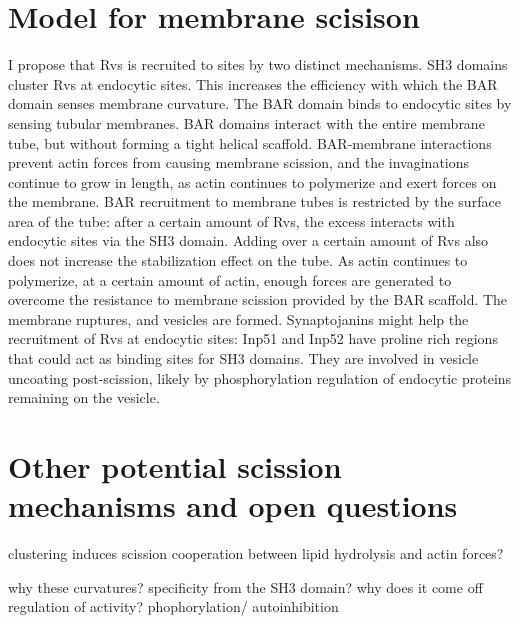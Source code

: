 \section{Model for membrane scisison}
I propose that Rvs is recruited to sites by two distinct mechanisms. SH3 domains cluster Rvs at endocytic sites. This increases the efficiency with which the BAR domain senses membrane curvature. The BAR domain binds to endocytic sites by sensing tubular membranes. BAR domains interact with the entire membrane tube, but without forming a tight helical scaffold. BAR-membrane interactions prevent actin forces from causing membrane scission, and the invaginations continue to grow in length, as actin continues to polymerize and exert forces on the membrane. BAR recruitment to membrane tubes is restricted by the surface area of the tube: after a certain amount of Rvs, the excess interacts with endocytic sites via the SH3 domain. Adding over a certain amount of Rvs also does not increase the stabilization effect on the tube. As actin continues to polymerize, at a certain amount of actin, enough forces are generated to overcome the resistance to membrane scission provided by the BAR scaffold. The membrane ruptures, and vesicles are formed. Synaptojanins might help the recruitment of Rvs at endocytic sites: Inp51 and Inp52 have proline rich regions that could act as binding sites for SH3 domains. They are involved in vesicle uncoating post-scission, likely by phosphorylation regulation of endocytic proteins remaining on the vesicle. 


\section{Other potential scission mechanisms and open questions}

\cite{Demitrieff.2015}
clustering induces scission 
cooperation between lipid hydrolysis and actin forces?


why these curvatures? specificity from the SH3 domain?
why does it come off
regulation of activity? phophorylation/ autoinhibition

